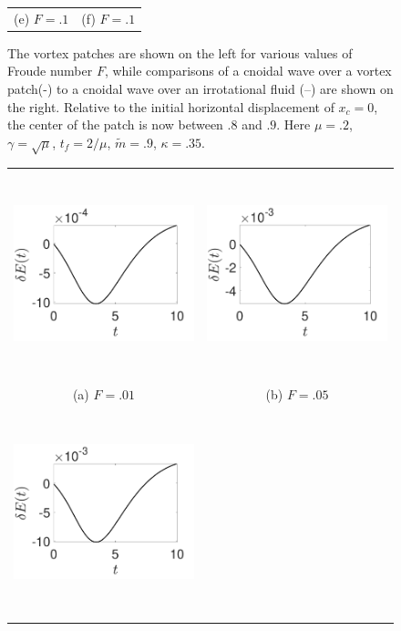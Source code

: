 \documentclass[a4paper,11pt]{article}
\begin{document}
\begin{figure}
\begin{tabular}{cc}
(e)  $F=.1$ & (f)  $F=.1$
\end{tabular}
\caption{The vortex patches are shown on the left for various values of Froude number $F$, while comparisons of a cnoidal wave over a vortex patch(-) to a cnoidal wave over an irrotational fluid (--) are shown on the right.  Relative to the initial horizontal displacement of $x_{c}=0$, the center of the patch is now between $.8$ and $.9$.  Here $\mu=.2$, $\gamma=\sqrt{\mu}$, $t_{f}=2/\mu$, $\tilde{m}=.9$, $\kappa = .35$.}
\label{fig:highsolwave}
\end{figure}

\begin{figure}
\centering
\begin{tabular}{cc}
\includegraphics[width=8cm,height=6cm]{energy_wm_1_modu_pt9} & \includegraphics[width=8cm,height=6cm]{energy_wm_5_modu_pt9} \\
(a) $F=.01$ & (b) $F=.05$\\
 \includegraphics[width=8cm,height=6cm]{energy_wm_10_modu_pt9}\\

\end{tabular}
\end{figure}
\end{document}
